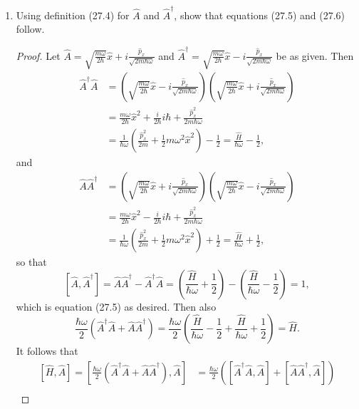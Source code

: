 \documentclass[11pt]{article}
\newcommand{\br}[1]{\left(#1\right)}
\newcommand{\sbr}[1]{\left[#1\right]}
\begin{document}
\begin{enumerate}[label=27.\arabic*]
    \item Using definition (27.4) for $\hat{A}$ and $\hat{A}^{\dagger}$, show that equations (27.5) and (27.6) follow.
    \begin{proof}
        Let $\hat{A} = \sqrt{\frac{m\omega}{2\hbar}}\hat{x} + i\frac{\hat{p}_x}{\sqrt{2m\hbar\omega}}$ and $\hat{A}^{\dagger} = \sqrt{\frac{m\omega}{2\hbar}}\hat{x} - i\frac{\hat{p}_x}{\sqrt{2m\hbar\omega}}$ be as given. Then \begin{align*}
            \hat{A}^{\dagger}\hat{A} &= \br{\sqrt{\frac{m\omega}{2\hbar}}\hat{x} - i\frac{\hat{p}_x}{\sqrt{2m\hbar\omega}}}\br{\sqrt{\frac{m\omega}{2\hbar}}\hat{x} + i\frac{\hat{p}_x}{\sqrt{2m\hbar\omega}}}\\
            &= \frac{m\omega}{2\hbar}\hat{x}^2 + \frac{i}{2\hbar}i\hbar + \frac{\hat{p}_x^2}{2m\hbar\omega}\\
            &= \frac{1}{\hbar\omega}\br{\frac{\hat{p}_x^2}{2m} + \frac{1}{2}m\omega^2\hat{x}^2}- \frac{1}{2} = \frac{\hat{H}}{\hbar\omega} - \frac{1}{2},
        \end{align*} and \begin{align*}
            \hat{A}\hat{A}^{\dagger} &= \br{\sqrt{\frac{m\omega}{2\hbar}}\hat{x} + i\frac{\hat{p}_x}{\sqrt{2m\hbar\omega}}}\br{\sqrt{\frac{m\omega}{2\hbar}}\hat{x} - i\frac{\hat{p}_x}{\sqrt{2m\hbar\omega}}}\\
            &= \frac{m\omega}{2\hbar}\hat{x}^2 - \frac{i}{2\hbar}i\hbar + \frac{\hat{p}_x^2}{2m\hbar\omega}\\
            &= \frac{1}{\hbar\omega}\br{\frac{\hat{p}_x^2}{2m} + \frac{1}{2}m\omega^2\hat{x}^2}+ \frac{1}{2} = \frac{\hat{H}}{\hbar\omega} + \frac{1}{2},
        \end{align*} so that \[\sbr{\hat{A}, \hat{A}^{\dagger}} = \hat{A}\hat{A}^{\dagger} - \hat{A}^{\dagger}\hat{A} = \br{\frac{\hat{H}}{\hbar\omega} + \frac{1}{2}} - \br{\frac{\hat{H}}{\hbar\omega} - \frac{1}{2}} = 1,\] which is equation (27.5) as desired. Then also \[\frac{\hbar\omega}{2}\br{\hat{A}^{\dagger}\hat{A} + \hat{A}\hat{A}^{\dagger}} = \frac{\hbar\omega}{2}\br{\frac{\hat{H}}{\hbar\omega} - \frac{1}{2} + \frac{\hat{H}}{\hbar\omega} + \frac{1}{2}} = \hat{H}.\] It follows that \begin{align*}
            \sbr{\hat{H}, \hat{A}} = \sbr{\frac{\hbar\omega}{2}\br{\hat{A}^{\dagger}\hat{A} + \hat{A}\hat{A}^{\dagger}}, \hat{A}} &= \frac{\hbar\omega}{2}\br{\sbr{\hat{A}^{\dagger}\hat{A}, \hat{A}} + \sbr{\hat{A}\hat{A}^{\dagger}, \hat{A}}}\\

\end{align*}
\end{proof}
\end{enumerate}
\end{document}
